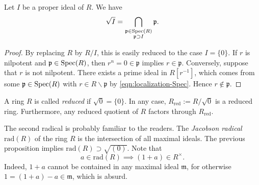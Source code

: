 \begin{proposition}
	Let $I$ be a proper ideal of $R$. We have
	\[ \sqrt{I} = \bigcap_{\substack{\mathfrak{p} \in \operatorname{Spec}(R) \\ \mathfrak{p} \supset I }} \mathfrak{p}. \]
\end{proposition}
\begin{proof}
	By replacing $R$ by $R/I$, this is easily reduced to the case $I = \{0\}$. If $r$ is nilpotent and $\mathfrak{p} \in \operatorname{Spec}(R)$, then $r^n = 0 \in \mathfrak{p}$ implies $r \in \mathfrak{p}$. Conversely, suppose that $r$ is not nilpotent. There exists a prime ideal in $R[r^{-1}]$, which comes from some $\mathfrak{p} \in \operatorname{Spec}(R)$ with $r \in R \smallsetminus \mathfrak{p}$ by \eqref{eqn:localization-Spec}. Hence $r \notin \mathfrak{p}$.
\end{proof}
\begin{remark}
	A ring $R$ is called \emph{reduced} if $\sqrt{0} = \{0\}$. In any case, $R_\text{red} := R \big/ \sqrt{0}$ is a reduced ring. Furthermore, any reduced quotient of $R$ factors through $R_\text{red}$.
\end{remark}

The second radical is probably familiar to the readers. The \emph{Jacobson radical} $\text{rad}(R)$ of the ring $R$ is the intersection of all maximal ideals. The previous proposition implies $\text{rad}(R) \supset \sqrt{(0)}$. Note that
\[ a \in \text{rad}(R) \implies (1+a) \in R^\times . \]
Indeed, $1+a$ cannot be contained in any maximal ideal $\mathfrak{m}$, for otherwise $1 = (1+a)-a \in \mathfrak{m}$, which is absurd. 

